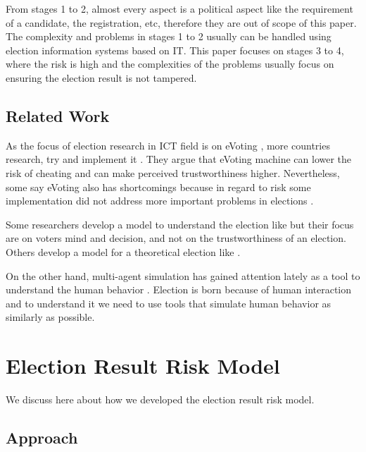 \documentclass[JIP]{ipsj}
\begin{document}
From stages 1 to 2, almost every aspect is a political aspect like the requirement of a candidate, the registration, etc, therefore they are out of scope of this paper. The complexity and problems in stages 1 to 2 usually can be handled using election information systems based on IT. This paper focuses on stages 3 to 4, where the risk is high and the complexities of the problems usually focus on ensuring the election result is not tampered.


\subsection{Related Work}%

As the focus of election research in ICT field is on eVoting \cite{Bryans2006}\cite{Volkamer2007}\cite{Mercuri2004}\cite{Kremer2005}, more countries research, try and implement it \cite{Tiresias20121212}. They argue that eVoting machine can lower the risk of cheating and can make perceived trustworthiness higher. Nevertheless, some say eVoting also has shortcomings \cite{ Hisamitsu2007}\cite{ Schryen2009} because in regard to risk some implementation did not address more important problems in elections \cite{ Wolchok2010}.

Some researchers develop a model to understand the election like \cite{ Yoneyama2007} but their focus are on voters mind and decision, and not on the trustworthiness of an election. Others develop a model for a theoretical election like \cite{ Rivest2008}\cite{ Langer2009}\cite{ Ryan2009}.

On the other hand, multi-agent simulation has gained attention lately as a tool to understand the human behavior \cite{ Drogoul2013}. Election is born because of human interaction and to understand it we need to use tools that simulate human behavior as similarly as possible.



\section{Election Result Risk Model}

We discuss here about how we developed the election result risk model.

\subsection{Approach}%
\end{document}
